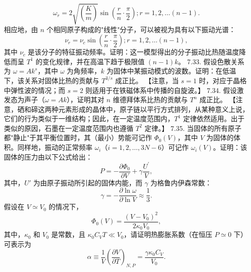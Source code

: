 \begin{equation}\tag{7.5.63}\label{eq:7.5.63}
\omega _ { r } = 2 \sqrt { \left( \frac { K } { m } \right) } \sin \left( \frac { r } { n } \cdot \frac { \pi } { 2 } \right) ; r = 1 , 2 , \ldots ( n - 1 ) .
\end{equation}
相应地，由 \(n\) 个相同原子构成的"线性"分子，可以被视为具有以下振动光谱：
\begin{equation}\tag{7.5.64}\label{eq:7.5.64}
\nu _ { r } = \nu _ { c } \sin \left( \frac { r } { n } \cdot \frac { \pi } { 2 } \right) ; r = 1 , 2 , \ldots ( n - 1 ) ,
\end{equation}
其中 \(\nu_{c}\) 是该分子的特征振动频率。证明：这一模型得出的分子振动比热随温度降低而呈 \(T^{1}\) 的变化规律，并在高温下趋于极限值 \((n-1)k\)。
7.33. 假设色散关系为 \(\omega = Ak^{s}\)，其中 \(\omega\) 为角频率，\(k\) 为固体中某振动模式的波数。证明：在低温下，该关系对固体比热的贡献与 \(T^{3/s}\) 成正比。
【注意，当 \(s=1\) 时，对应于晶格中弹性波的情况；而 \(s=2\) 则适用于在铁磁体系中传播的自旋波。】
7.34. 假设激发态为声子（\(\omega = Ak\)），证明其对 \(n\) 维德拜体系比热的贡献与 \(T^n\) 成正比。
【注意，硒和碲这两种元素形成的晶体中，原子链以平行方式排列，从某种意义上说，它们的行为类似于一维结构；因此，在一定温度范围内，\(T^1\) 定律依然适用。出于类似的原因，石墨在一定温度范围内也遵循 \(T^2\) 定律。】
7.35. 当固体的所有原子都"静止"于其平衡位置时，其（最小）势能可记作 \(\Phi_{0}(V)\)，其中 \(V\) 为固体的体积。同样地，振动的正常频率 \(\omega_{i}\)（\(i=1,2,\ldots,3N-6\)）可记作 \(\omega_{i}(V)\)。证明：该固体的压力由以下公式给出：
\begin{equation}\tag{7.5.65}\label{eq:7.5.65}
P = - \frac { \partial \Phi _ { 0 } } { \partial V } + \gamma \frac { U ^{\prime} } { V } ,
\end{equation}
其中，\(U'\) 为由原子振动所引起的固体内能，而 \(\gamma\) 为格鲁内伊森常数：
\begin{equation}\tag{7.5.66}\label{eq:7.5.66}
\gamma = - \frac { \partial \ln \omega } { \partial \ln V } \approx \frac { 1 } { 3 } .
\end{equation}
假设在 \(V \simeq V_0\) 的情况下，
\begin{equation}\tag{7.5.67}\label{eq:7.5.67}
\Phi _ { 0 } ( V ) = \frac { ( V - V _ { 0 } ) ^{2} } { 2 \kappa _ { 0 } V _ { 0 } } ,
\end{equation}
其中，\(\kappa_{0}\) 和 \(V_{0}\) 是常数，且 \(\kappa_{0}C_{V}T \ll V_{0}\)，请证明热膨胀系数（在恒压 \(P \simeq 0\) 下）可表示为
\begin{equation}\tag{7.5.68}\label{eq:7.5.68}
\alpha \equiv \frac { 1 } { V } \left( \frac { \partial V } { \partial T } \right) _ { N , P } = \frac { \gamma \kappa _ { 0 } C _ { V } } { V _ { 0 } } .
\end{equation}
